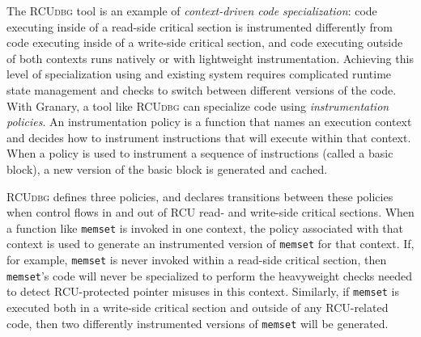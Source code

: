 \documentclass[preprint]{sigplanconf}
\newcommand{\toolname}[1]{{\scshape #1}}
\begin{document}

The \toolname{RCUdbg} tool is an example of \emph{context-driven code specialization}: code executing inside of a read-side critical section is instrumented differently from code executing inside of a write-side critical section, and code executing outside of both contexts runs natively or with lightweight instrumentation. Achieving this level of specialization using and existing system requires complicated runtime state management and checks to switch between different versions of the code. With Granary, a tool like \toolname{RCUdbg} can specialize code using \emph{instrumentation policies}. An instrumentation policy is a function that names an execution context and decides how to instrument instructions that will execute within that context. When a policy is used to instrument a sequence of instructions (called a basic block), a new version of the basic block is generated and cached. 

\toolname{RCUdbg} defines three policies, and declares transitions between these policies when control flows in and out of RCU read- and write-side critical sections. When a function like \texttt{memset} is invoked in one context, the policy associated with that context is used to generate an instrumented version of \texttt{memset} for that context. If, for example, \texttt{memset} is never invoked within a read-side critical section, then \texttt{memset}'s code will never be specialized to perform the heavyweight checks needed to detect RCU-protected pointer misuses in this context. Similarly, if \texttt{memset} is executed both in a write-side critical section and outside of any RCU-related code, then two differently instrumented versions of \texttt{memset} will be generated.
\end{document}
